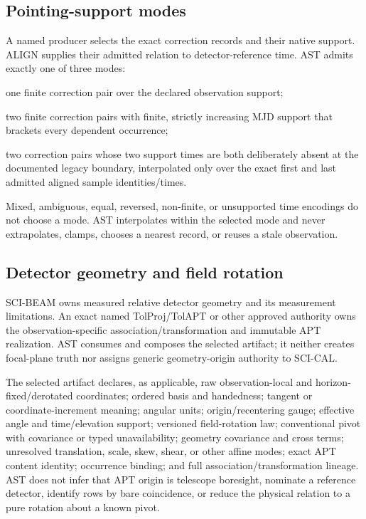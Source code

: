 \subsection{Pointing-support modes}

A named producer selects the exact correction records and their native
support.  ALIGN supplies their admitted relation to detector-reference time.
AST admits exactly one of three modes:
\begin{description}[style=nextline,leftmargin=1.45em]
  \item[\texttt{constant}] one finite correction pair over the declared
    observation support;
  \item[\texttt{bracketed\_mjd}] two finite correction pairs with finite,
    strictly increasing MJD support that brackets every dependent occurrence;
  \item[\texttt{legacy\_observation\_span}] two correction pairs whose two
    support times are both deliberately absent at the documented legacy
    boundary, interpolated only over the exact first and last admitted aligned
    sample identities/times.
\end{description}
Mixed, ambiguous, equal, reversed, non-finite, or unsupported time encodings
do not choose a mode.  AST interpolates within the selected mode and never
extrapolates, clamps, chooses a nearest record, or reuses a stale observation.

\subsection{Detector geometry and field rotation}

SCI-BEAM owns measured relative detector geometry and its measurement
limitations.  An exact named TolProj/TolAPT or other approved authority owns
the observation-specific association/transformation and immutable APT
realization.  AST consumes and composes the selected artifact; it neither
creates focal-plane truth nor assigns generic geometry-origin authority to
SCI-CAL.

The selected artifact declares, as applicable, raw observation-local and
horizon-fixed/derotated coordinates; ordered basis and handedness; tangent or
coordinate-increment meaning; angular units; origin/recentering gauge;
effective angle and time/elevation support; versioned field-rotation law;
conventional pivot with covariance or typed unavailability; geometry
covariance and cross terms; unresolved translation, scale, skew, shear, or
other affine modes; exact APT content identity; occurrence binding; and full
association/transformation lineage.  AST does not infer that APT origin is
telescope boresight, nominate a reference detector, identify rows by bare
coincidence, or reduce the physical relation to a pure rotation about a known
pivot.

